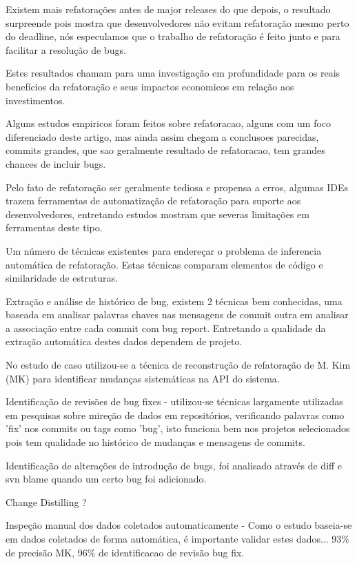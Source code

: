 \documentclass[12pt]{article}
\begin{document}
Existem mais refatorações antes de major releases do que depois, o resultado surpreende pois mostra que desenvolvedores não evitam refatoração mesmo perto do deadline, nós especulamos que o trabalho de refatoração é feito junto e para facilitar a resolução de bugs.

Estes resultados chamam para uma investigação em profundidade para os reais benefícios da refatoração e seus impactos economicos em relação aos investimentos.

Alguns estudos empiricos foram feitos sobre refatoracao, alguns com um foco diferenciado deste artigo, mas ainda assim chegam a conclusoes parecidas, commits grandes, que sao geralmente resultado de refatoracao, tem grandes chances de incluir bugs.

Pelo fato de refatoração ser geralmente tediosa e propensa a erros, algumas IDEs trazem ferramentas de automatização de refatoração para suporte aos desenvolvedores, entretando estudos mostram que severas limitações em ferramentas deste tipo.

Um número de técnicas existentes para endereçar o problema de inferencia automática de refatoração. Estas técnicas comparam elementos de código e similaridade de estruturas.

Extração e análise de histórico de bug, existem 2 técnicas bem conhecidas, uma baseada em analisar palavras chaves nas mensagens de commit outra em analisar a associação entre cada commit com bug report. Entretando a qualidade da extração  automática destes dados dependem de projeto.

No estudo de caso utilizou-se a técnica de reconstrução de refatoração de M. Kim (MK) para identificar mudanças sistemáticas na API do sistema.

Identificação de revisões de bug fixes - utilizou-se técnicas largamente utilizadas em pesquisas sobre mireção de dados em repositórios, verificando palavras como 'fix' nos commits ou tags como 'bug', isto funciona bem nos projetos selecionados pois tem qualidade no histórico de mudanças e mensagens de commits.

Identificação de alterações de introdução de bugs, foi analisado através de diff e svn blame quando um certo bug foi adicionado.

Change Distilling ?

Inspeção manual dos dados coletados automaticamente - Como o estudo baseia-se em dados coletados de forma automática, é importante validar estes dados... 93\% de precisão MK, 96\% de identificacao de revisão bug fix.
\end{document}
